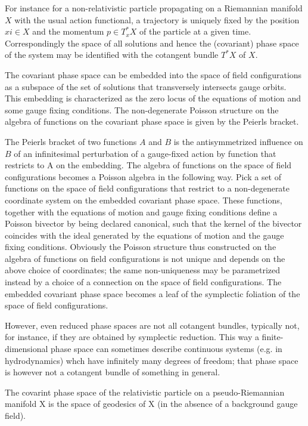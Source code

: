 \documentclass[Main]{subfiles}
\begin{document}
 For instance for a non-relativistic particle propagating on a Riemannian manifold $X$ with the usual action functional, a trajectory is uniquely fixed by the position $xi \in X$ and the momentum $p\in T^*_x X$ of the particle at a given time. 
 Correspondingly the space of all solutions and hence the (covariant) phase space of the system may be identified with the cotangent bundle $T^*X$ of $X$.

 The covariant phase space can be embedded into the space of field configurations as a subspace of the set of solutions that transversely intersects gauge orbits.  
 This embedding is characterized as the zero locus of the equations of motion and some gauge fixing conditions. The non-degenerate Poisson structure on the algebra of functions on the covariant phase space is given by the Peierls bracket.

 The Peierls bracket of two functions $A$ and $B$ is the antisymmetrized influence on $B$ of an infinitesimal perturbation of a gauge-fixed action by function that restricts to A on the embedding. 
 The algebra of functions on the space of field configurations becomes a Poisson algebra in the following way. Pick a set of functions on the space of field configurations that restrict to a non-degenerate coordinate system on the embedded covariant phase space. 
 These functions, together with the equations of motion and gauge fixing conditions define a Poisson bivector by being declared canonical, such that the kernel of the bivector coincides with the ideal generated by the equations of motion and the gauge fixing conditions. 
 Obviously the Poisson structure thus constructed on the algebra of functions on field configurations is not unique and depends on the above choice of coordinates; the same non-uniqueness may be parametrized instead by a choice of a connection on the space of field configurations. 
 The embedded covariant phase space becomes a leaf of the symplectic foliation of the space of field configurations.

 However, even reduced phase spaces are not all cotangent bundles, typically not, for instance, if they are obtained by symplectic reduction. 
 This way a finite-dimensional phase space can sometimes describe continuous systems (e.g. in hydrodynamics) whch have infinitely many degrees of freedom; that phase space is however not a cotangent bundle of something in general.

 \begin{example}
  The covarint phase space of the relativistic particle on a pseudo-Riemannian manifold X is the space of geodesics of X (in the absence of a background gauge field).
 \end{example}
\end{document}
